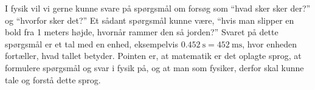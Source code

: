 I fysik vil vi gerne kunne svare på spørgsmål om forsøg som ``hvad sker sker der?'' og ``hvorfor sker det?'' Et sådant spørgsmål kunne være, ``hvis man slipper en bold fra 1 meters højde, hvornår rammer den så jorden?'' Svaret på dette spørgsmål er et tal med en enhed, eksempelvis $\SI{0.452}{\second} = \SI{452}{\milli\second}$, hvor enheden fortæller, hvad tallet betyder. Pointen er, at matematik er det oplagte sprog, at formulere spørgsmål og svar i fysik på, og at man som fysiker, derfor skal kunne tale og forstå dette sprog.

